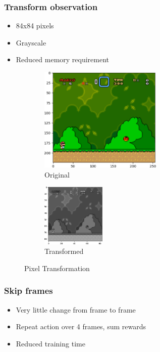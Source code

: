 \documentclass{article}
\begin{document}
    \subsubsection{Transform observation}
    \begin{itemize}
        \item 84x84 pixels
        \item Grayscale
        \item Reduced memory requirement
    \end{itemize}
    \begin{figure}[H]
        \centering
        \begin{subfigure}{.5\textwidth}
            \centering
            \includegraphics[height=5cm]{original_crop}
            \caption{Original}
            \label{fig:sub1}
        \end{subfigure}%
        \begin{subfigure}{.5\textwidth}
            \centering
            \includegraphics[height=3cm]{grayscale_crop}
            \caption{Transformed}
            \label{fig:sub2}
        \end{subfigure}
        \caption{Pixel Transformation}
        \label{fig:transformation}
    \end{figure}
    \subsubsection{Skip frames}
    \begin{itemize}
        \item Very little change from frame to frame
        \item Repeat action over 4 frames, sum rewards
        \item Reduced training time
    \end{itemize}
\end{document}
